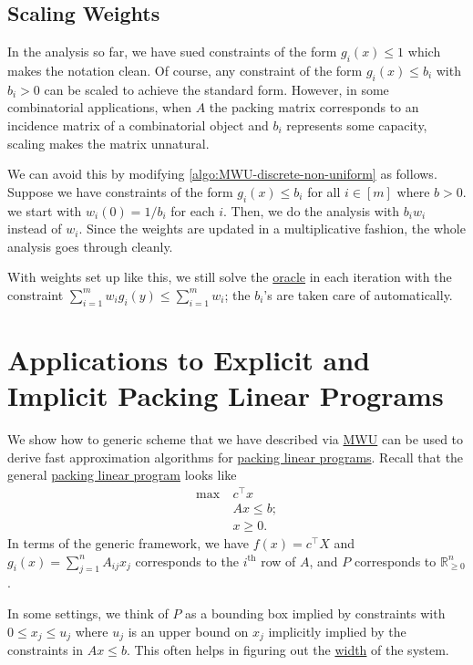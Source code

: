 \subsection{Scaling Weights}
In the analysis so far, we have sued constraints of the form \(g_i(x) \leq 1\) which makes the notation clean. Of course, any constraint of the form \(g_i(x) \leq b_i\) with \(b_i > 0\) can be scaled to achieve the standard form. However, in some combinatorial applications, when \(A\) the packing matrix corresponds to an incidence matrix of a combinatorial object and \(b_i\) represents some capacity, scaling makes the matrix unnatural.

We can avoid this by modifying \autoref{algo:MWU-discrete-non-uniform} as follows. Suppose we have constraints of the form \(g_i(x) \leq b_i\) for all \(i \in [m]\) where \(b > 0\). we start with \(w_i(0) = 1 / b_i\) for each \(i\). Then, we do the analysis with \(b_i w_i\) instead of \(w_i\). Since the weights are updated in a multiplicative fashion, the whole analysis goes through cleanly.

\begin{note}
	With weights set up like this, we still solve the \hyperref[eq:MWU-oracle]{oracle} in each iteration with the constraint \(\sum_{i=1}^{m} w_i g_i(y) \leq \sum_{i=1}^{m} w_i\); the \(b_i\)'s are taken care of automatically.
\end{note}

\section{Applications to Explicit and Implicit Packing Linear Programs}
We show how to generic scheme that we have described via \hyperref[algo:MWU-discrete-non-uniform]{MWU} can be used to derive fast approximation algorithms for \hyperref[def:packing-LP]{packing linear programs}. Recall that the general \hyperref[def:packing-LP]{packing linear program} looks like
\[
	\begin{aligned}
		\max~ & c^{\top} x  \\
		      & Ax \leq b ; \\
		      & x \geq 0.
	\end{aligned}
\]
In terms of the generic framework, we have \(f(x) = c^{\top} X\) and \(g_i(x) = \sum_{j=1}^{n} A_{ij} x_j\) corresponds to the \(i^{\text{th} }\) row of \(A\), and \(P\) corresponds to \(\mathbb{R} _{\geq 0}^n\).

\begin{note}
	In some settings, we think of \(P\) as a bounding box implied by constraints with \(0 \leq x_j \leq u_j\) where \(u_j\) is an upper bound on \(x_j\) implicitly implied by the constraints in \(Ax \leq b\). This often helps in figuring out the \hyperref[def:width]{width} of the system.
\end{note}

